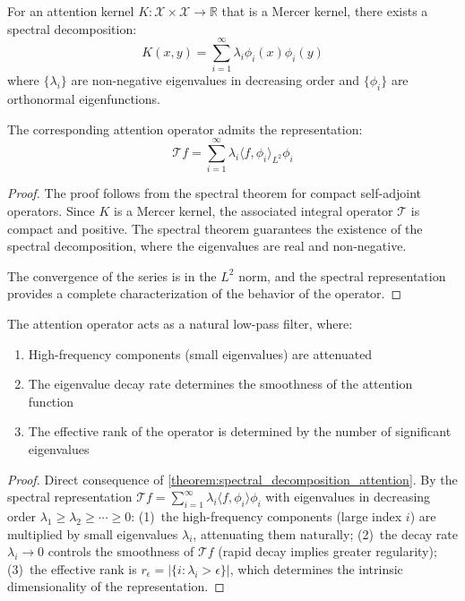 \begin{theorem}\label{theorem:spectral_decomposition_attention}
    For an attention kernel $K: \mathcal{X} \times \mathcal{X} \to \mathbb{R}$ that is a Mercer kernel, there exists a spectral decomposition:
    \begin{equation}
        K(x, y) = \sum_{i=1}^{\infty} \lambda_i \phi_i(x) \phi_i(y)
        \label{eq:mercer_decomposition_attention}
    \end{equation}
    where $\{\lambda_i\}$ are non-negative eigenvalues in decreasing order and $\{\phi_i\}$ are orthonormal eigenfunctions.

    The corresponding attention operator admits the representation:
    \begin{equation}
        \mathcal{T}f = \sum_{i=1}^{\infty} \lambda_i \langle f, \phi_i \rangle_{L^2} \phi_i
        \label{eq:spectral_representation_attention}
    \end{equation}
\end{theorem}

\begin{proof}
    The proof follows from the spectral theorem for compact self-adjoint operators. Since $K$ is a Mercer kernel, the associated integral operator $\mathcal{T}$ is compact and positive. The spectral theorem guarantees the existence of the spectral decomposition, where the eigenvalues are real and non-negative.

    The convergence of the series is in the $L^2$ norm, and the spectral representation provides a complete characterization of the behavior of the operator.
\end{proof}

\begin{corollary}\label{cor:spectral_filtering}
    The attention operator acts as a natural low-pass filter, where:
    \begin{enumerate}
        \item High-frequency components (small eigenvalues) are attenuated
        \item The eigenvalue decay rate determines the smoothness of the attention function
        \item The effective rank of the operator is determined by the number of significant eigenvalues
    \end{enumerate}
\end{corollary}

\begin{proof}
Direct consequence of \autoref{theorem:spectral_decomposition_attention}. By the spectral representation $\mathcal{T}f = \sum_{i=1}^\infty \lambda_i \langle f, \phi_i \rangle \phi_i$ with eigenvalues in decreasing order $\lambda_1 \geq \lambda_2 \geq \cdots \geq 0$: (1)~the high-frequency components (large index $i$) are multiplied by small eigenvalues $\lambda_i$, attenuating them naturally; (2)~the decay rate $\lambda_i \to 0$ controls the smoothness of $\mathcal{T}f$ (rapid decay implies greater regularity); (3)~the effective rank is $r_\epsilon = |\{i : \lambda_i > \epsilon\}|$, which determines the intrinsic dimensionality of the representation.
\end{proof}

